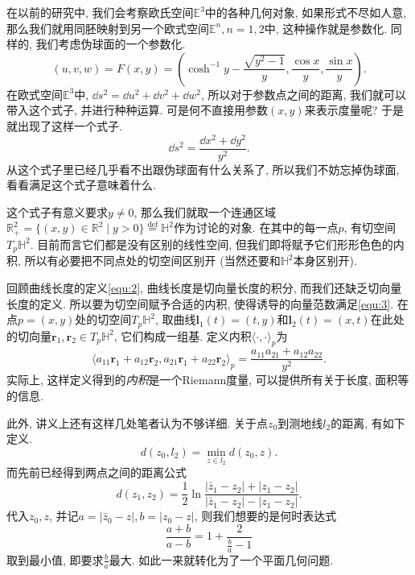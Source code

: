 \documentclass[./main.tex]{subfiles}
\begin{document}
在以前的研究中, 我们会考察欧氏空间\(\mathbb{E}^3\)中的各种几何对象, 如果形式不尽如人意, 那么我们就用同胚映射到另一个欧式空间\(\mathbb{E}^n,n=1,2\)中, 这种操作就是参数化. 同样的, 我们考虑伪球面的一个参数化.
\[
    (u,v,w)=F(x,y)=\left(\cosh^{-1}y-\frac{\sqrt{y^2-1}}{y},\frac{\cos x}{y},\frac{\sin x}{y}\right).
\]
在欧式空间\(\mathbb{E}^3\)中, \(\dd s^2=\dd u^2+\dd v^2+\dd w^2\), 所以对于参数点之间的距离, 我们就可以带入这个式子, 并进行种种运算. 可是何不直接用参数\((x,y)\)来表示度量呢? 于是就出现了这样一个式子.
\begin{equation}\label{equ:3}
    \dd s^2=\frac{\dd x^2+\dd y^2}{y^2}.
\end{equation}
从这个式子里已经几乎看不出跟伪球面有什么关系了, 所以我们不妨忘掉伪球面, 看看满足这个式子意味着什么.

这个式子有意义要求\(y\ne0\), 那么我们就取一个连通区域\(\mathbb{R}^2_+=\{(x,y)\in\mathbb{R}^2\mid y>0\}\overset{\text{def}}{=}\mathbb{H}^2\)作为讨论的对象. 在其中的每一点\(p\), 有切空间\(T_p\mathbb{H}^2\). 目前而言它们都是没有区别的线性空间, 但我们即将赋予它们形形色色的内积, 所以有必要把不同点处的切空间区别开 (当然还要和\(\mathbb{H}^2\)本身区别开).

回顾曲线长度的定义\eqref{equ:2}, 曲线长度是切向量长度的积分, 而我们还缺乏切向量长度的定义. 所以要为切空间赋予合适的内积, 使得诱导的向量范数满足\eqref{equ:3}. 在点\(p=(x,y)\)处的切空间\(T_p\mathbb{H}^2\), 取曲线\(\mathbf{l}_1(t)=(t,y)\)和\(\mathbf{l}_2(t)=(x,t)\)在此处的切向量\(\mathbf{r}_1,\mathbf{r}_2\in T_p\mathbb{H}^2\), 它们构成一组基. 定义内积\(\langle\cdot,\cdot\rangle_p\)为
\[
    \langle a_{11}\mathbf{r}_1+a_{12}\mathbf{r}_2,a_{21}\mathbf{r}_1+a_{22}\mathbf{r}_2\rangle_p=\frac{a_{11}a_{21}+a_{12}a_{22}}{y^2}.
\]
实际上, 这样定义得到的\textit{内积}是一个Riemann度量, 可以提供所有关于长度, 面积等的信息.

此外, 讲义上还有这样几处笔者认为不够详细. 关于点\(z_0\)到测地线\(l_2\)的距离, 有如下定义.
\[
    d(z_0,l_2)=\min_{z\in l_2}d(z_0,z).
\]
而先前已经得到两点之间的距离公式
\[
    d(z_1,z_2)=\frac{1}{2}\ln \frac{|\bar z_1-z_2|+|z_1-z_2|}{|\bar z_1-z_2|-|z_1-z_2|}.
\]
代入\(z_0,z\), 并记\(a=|\bar z_0-z|,b=|z_0-z|\), 则我们想要的是何时表达式
\[
    \frac{a+b}{a-b}=1+\frac{2}{\frac{b}{a}-1}
\]
取到最小值, 即要求\(\frac{b}{a}\)最大. 如此一来就转化为了一个平面几何问题.
\begin{figure}[!ht]
    \centering
\end{figure}
\end{document}

